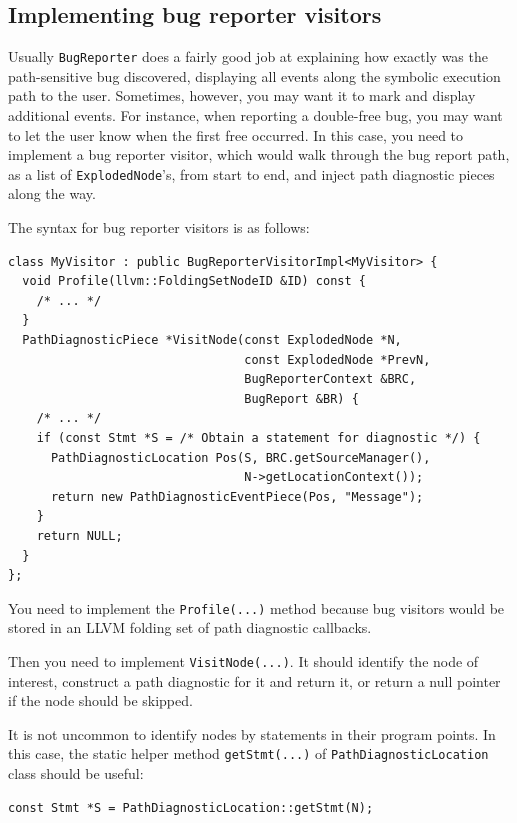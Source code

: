 \documentclass[a4paper,12pt]{article}
\newenvironment{nobr}{\begin{minipage}{\textwidth}\setlength\parskip{1em}
}{\end{minipage}\ignorespacesafterend}
\begin{document}
\subsection{Implementing bug reporter visitors}\label{subsec:bug_visitors}

Usually \lstinline|BugReporter| does a fairly good job at explaining how exactly was the path-sensitive bug discovered, displaying all events along the symbolic execution path to the user. Sometimes, however, you may want it to mark and display additional events. For instance, when reporting a double-free bug, you may want to let the user know when the first free occurred. In this case, you need to implement a bug reporter visitor, which would walk through the bug report path, as a list of \lstinline|ExplodedNode|'s, from start to end, and inject path diagnostic pieces along the way.

\begin{nobr}
The syntax for bug reporter visitors is as follows:
\begin{lstlisting}[style=cplusplus]
class MyVisitor : public BugReporterVisitorImpl<MyVisitor> {
  void Profile(llvm::FoldingSetNodeID &ID) const {
    /* ... */
  }
  PathDiagnosticPiece *VisitNode(const ExplodedNode *N,
                                 const ExplodedNode *PrevN,
                                 BugReporterContext &BRC,
                                 BugReport &BR) {
    /* ... */
    if (const Stmt *S = /* Obtain a statement for diagnostic */) {
      PathDiagnosticLocation Pos(S, BRC.getSourceManager(),
                                 N->getLocationContext());
      return new PathDiagnosticEventPiece(Pos, "Message");
    }
    return NULL;
  }
};
\end{lstlisting}
\end{nobr}

You need to implement the \lstinline|Profile(...)| method because bug visitors would be stored in an LLVM folding set of path diagnostic callbacks.

Then you need to implement \lstinline|VisitNode(...)|. It should identify the node of interest, construct a path diagnostic for it and return it, or return a null pointer if the node should be skipped.

\begin{nobr}
It is not uncommon to identify nodes by statements in their program points. In this case, the static helper method \lstinline|getStmt(...)| of \lstinline{PathDiagnosticLocation} class should be useful:

\begin{lstlisting}[style=cplusplus,numbers=none]
const Stmt *S = PathDiagnosticLocation::getStmt(N);
\end{lstlisting}
\end{nobr}
\end{document}
